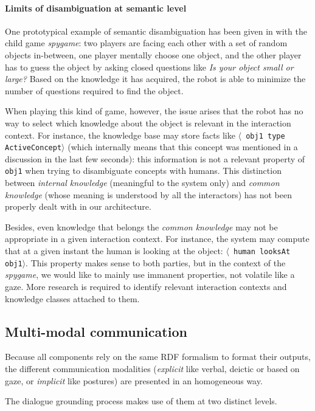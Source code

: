 \documentclass[letterpaper, 10 pt, conference]{ieeeconf}  %
\newcommand{\concept}[1]{{\small \texttt{#1}}}
\newcommand{\stmt}[1]{{\footnotesize \tt $\langle$ #1\relax$\rangle$}}
\begin{document}
\paragraph*{Limits of disambiguation at semantic level}

One prototypical example of semantic disambiguation has been given in
\cite{Ros2010b} with the child game \emph{spygame}: two players are facing
each other with a set of random objects in-between, one player mentally choose
one object, and the other player has to guess the object by asking closed
questions like \emph{Is your object small or large?} Based on the knowledge it
has acquired, the robot is able to minimize the number of questions required to
find the object.

When playing this kind of game, however, the issue arises that the robot has no
way to select which knowledge about the object is relevant in the interaction
context. For instance, the knowledge base may store facts like \stmt{obj1 type
ActiveConcept} (which internally means that this concept was mentioned in a
discussion in the last few seconds): this information is not a relevant
property of \concept{obj1} when trying to disambiguate concepts with humans.
This distinction between \emph{internal knowledge} (meaningful to
the system only) and \emph{common knowledge} (whose meaning is understood by
all the interactors) has not been properly dealt with in our architecture.

Besides, even knowledge that belongs the \emph{common knowledge} may not be
appropriate in a given interaction context. For instance, the system may
compute that at a given instant the human is looking at the object: \stmt{human
looksAt obj1}. This property makes sense to both parties, but in the context of
the \emph{spygame}, we would like to mainly use immanent properties, not
volatile like a gaze. More research is required to identify relevant
interaction contexts and knowledge classes attached to them.

\subsection{Multi-modal communication}

Because all components rely on the same RDF formalism to format their outputs,
the different communication modalities (\emph{explicit} like verbal, deictic or
based on gaze, or \emph{implicit} like postures) are presented in an
homogeneous way.

The dialogue grounding process makes use of them at two distinct levels.
\end{document}
